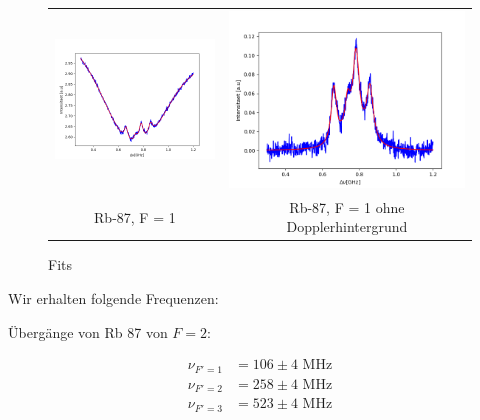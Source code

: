 \documentclass[a4paper,parskip]{scrartcl}
\begin{document}
\begin{figure}[p]
\begin{tabular}{cc}
    \includegraphics[scale = 0.45]{./saturation/peak4/fit.png}  &  \includegraphics[scale = 0.45]{./saturation/peak4/gaussCorrected.png}  \\
    {\footnotesize Rb-87, F = 1} &  {\footnotesize Rb-87, F = 1 ohne Dopplerhintergrund}  \\
\end{tabular}
\caption{Fits}
\label{fig:Abbildung1}
\end{figure}

Wir erhalten folgende Frequenzen:

Übergänge von Rb 87 von $F=2$:

\begin{align*}
\nu_{F'=1} &= 106 \pm 4 \text{ MHz} \\
\nu_{F'=2} &= 258 \pm 4 \text{ MHz} \\
\nu_{F'=3} &= 523 \pm 4 \text{ MHz}  
\end{align*}
\end{document}
